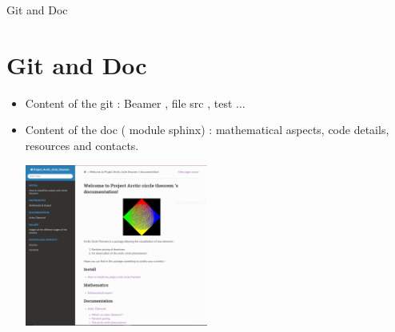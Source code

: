 \documentclass [xcolor=svgnames, t] {beamer}
\begin{document}
\begin{frame}{Git and Doc}
\section{Git and Doc}
\begin{itemize}
    \item Content of the git : Beamer , file src , test ...
    \item Content of the doc ( module sphinx) : mathematical aspects, code details, resources and contacts.
\begin{center}
    
\includegraphics[width=6cm]{paged'acceuil.PNG}    
\end{center}
\end{itemize}
\end{frame}
\end{document}
